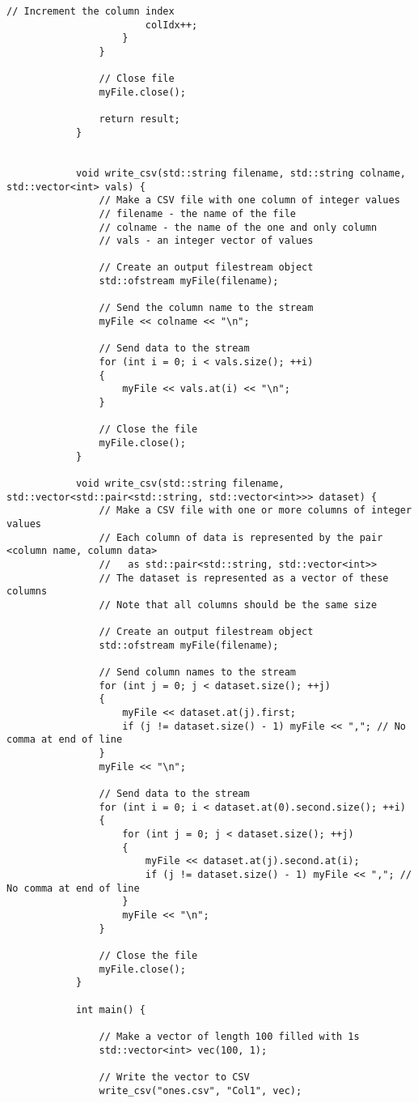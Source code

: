 \documentclass[a4paper]{article}
\begin{document}
\begin{scriptsize}
\begin{lstlisting}[caption={read and write '.csv' in one '.cpp' file}, label=lst:rcode]
						// Increment the column index
						colIdx++;
					}
				}
				
				// Close file
				myFile.close();
				
				return result;
			}
			
			
			void write_csv(std::string filename, std::string colname, std::vector<int> vals) {
				// Make a CSV file with one column of integer values
				// filename - the name of the file
				// colname - the name of the one and only column
				// vals - an integer vector of values
				
				// Create an output filestream object
				std::ofstream myFile(filename);
				
				// Send the column name to the stream
				myFile << colname << "\n";
				
				// Send data to the stream
				for (int i = 0; i < vals.size(); ++i)
				{
					myFile << vals.at(i) << "\n";
				}
				
				// Close the file
				myFile.close();
			}
			
			void write_csv(std::string filename, std::vector<std::pair<std::string, std::vector<int>>> dataset) {
				// Make a CSV file with one or more columns of integer values
				// Each column of data is represented by the pair <column name, column data>
				//   as std::pair<std::string, std::vector<int>>
				// The dataset is represented as a vector of these columns
				// Note that all columns should be the same size
				
				// Create an output filestream object
				std::ofstream myFile(filename);
				
				// Send column names to the stream
				for (int j = 0; j < dataset.size(); ++j)
				{
					myFile << dataset.at(j).first;
					if (j != dataset.size() - 1) myFile << ","; // No comma at end of line
				}
				myFile << "\n";
				
				// Send data to the stream
				for (int i = 0; i < dataset.at(0).second.size(); ++i)
				{
					for (int j = 0; j < dataset.size(); ++j)
					{
						myFile << dataset.at(j).second.at(i);
						if (j != dataset.size() - 1) myFile << ","; // No comma at end of line
					}
					myFile << "\n";
				}
				
				// Close the file
				myFile.close();
			}
			
			int main() {
				
				// Make a vector of length 100 filled with 1s
				std::vector<int> vec(100, 1);
				
				// Write the vector to CSV
				write_csv("ones.csv", "Col1", vec);
				

\end{lstlisting}
\end{scriptsize}
\end{document}
